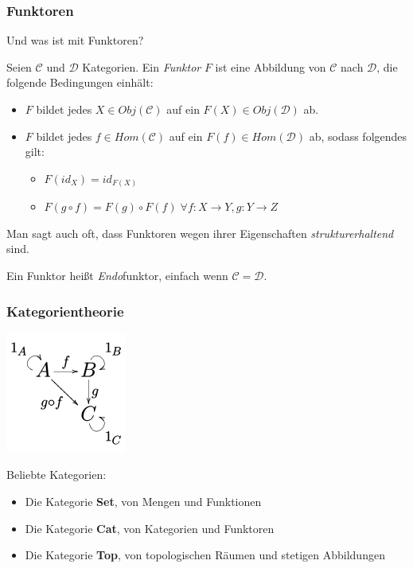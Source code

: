 \documentclass{beamer}
\begin{document}
\begin{frame}
\frametitle{Funktoren}
Und was ist mit Funktoren?\pause\bigskip

Seien $\mathcal{C}$ und $\mathcal{D}$ Kategorien. Ein \emph{Funktor} $F$ ist eine Abbildung
von $\mathcal{C}$ nach $\mathcal{D}$, die folgende Bedingungen einhält:

\begin{itemize}
\pause \item $F$ bildet jedes $X \in Obj(\mathcal{C})$ auf ein $F(X) \in Obj(\mathcal{D})$ ab.
\pause \item $F$ bildet jedes $f \in Hom(\mathcal{C})$ auf ein $F(f) \in Hom(\mathcal{D})$ ab, sodass folgendes gilt:
\begin{itemize}
\pause \item $F(id_X) = id_{F(X)}$
\pause \item $F(g \circ f) = F(g) \circ F(f) \; \forall f: X \to Y, g : Y \to Z$
\end{itemize}
\end{itemize}
\pause\bigskip

Man sagt auch oft, dass Funktoren wegen ihrer Eigenschaften \emph{strukturerhaltend} sind.\pause\smallskip\smallskip

Ein Funktor heißt \emph{Endo}funktor, einfach wenn $\mathcal{C} = \mathcal{D}$.

\end{frame}


\begin{frame}
\frametitle{Kategorientheorie}

\begin{multicols}{2}

\begin{center}
\includegraphics[scale=0.8]{150px-Category_SVG.png} 
\end{center}

\columnbreak
\pause

Beliebte Kategorien:\bigskip

\begin{itemize}
\pause\item Die Kategorie \textbf{Set}, von Mengen und Funktionen
\pause\item Die Kategorie \textbf{Cat}, von Kategorien und Funktoren
\pause\item Die Kategorie \textbf{Top}, von topologischen Räumen und stetigen Abbildungen
\end{itemize}

\end{multicols}

\end{frame}
\end{document}
